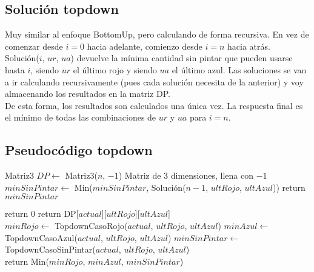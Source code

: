 \subsection{Solución topdown}
Muy similar al enfoque BottomUp, pero calculando de forma recursiva. En vez de comenzar desde $i = 0$ hacia adelante, comienzo desde $i = n$ hacia atrás. \\

Solución($i$, $ur$, $ua$) devuelve la mínima cantidad sin pintar que pueden usarse hasta $i$, siendo $ur$ el último rojo y siendo $ua$ el último azul. Las soluciones se van a ir calculando recursivamente (pues cada solución necesita de la anterior) y voy almacenando los resultados en la matriz DP. \\

De esta forma, los resultados son calculados una única vez. La respuesta final es el mínimo de todas las combinaciones de $ur$ y $ua$ para $i = n$. \\


\subsection{Pseudocódigo topdown}

\begin{algorithm}[H]
\begin{algorithmic}
  \State Matriz3 $DP \gets$ Matriz3($n$, $-1$) \Comment Matriz de 3 dimensiones, llena con $-1$
            \State $minSinPintar \gets$ Min($minSinPintar$, Solución($n-1$, $ultRojo$, $ultAzul$))
        \EndFor
    \EndFor
    \State return $minSinPintar$
\EndProcedure
\end{algorithmic}
\end{algorithm} 


\begin{algorithm}[H]
\begin{algorithmic}
        return $0$
    \EndIf
        return DP[$actual$][$ultRojo$][$ultAzul$]
    \EndIf \\

    \State $minRojo \gets$ TopdownCasoRojo($actual$, $ultRojo$, $ultAzul$)
    \State $minAzul \gets$ TopdownCasoAzul($actual$, $ultRojo$, $ultAzul$)
    \State $minSinPintar \gets$ TopdownCasoSinPintar($actual$, $ultRojo$, $ultAzul$) \\

    \State return Min($minRojo$, $minAzul$, $minSinPintar$)
\EndProcedure
\end{algorithmic}
\end{algorithm} 


